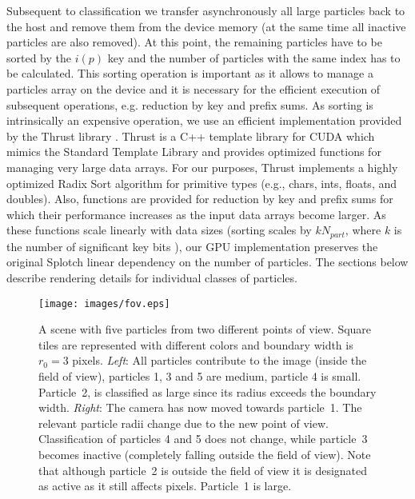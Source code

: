 \documentclass[1p]{elsarticle}
\begin{document}
Subsequent to classification we transfer asynchronously all large particles back to the host and remove them from the device memory (at the same time all inactive particles are also removed). At this point, the remaining particles have to be sorted by the $i(p)$ key and the number of particles with the same index has to be calculated.
This sorting operation is important as it allows to manage a particles array on the device and it is  
necessary for the efficient execution of subsequent operations, e.g. reduction by key and prefix sums.
As sorting is intrinsically an expensive operation, we use an efficient implementation provided by the Thrust library \cite{thrusturl}. Thrust is a C++ template library for CUDA which mimics the Standard Template Library and provides optimized functions for managing very large data arrays. For our purposes, Thrust implements a highly optimized Radix Sort algorithm for primitive types (e.g., chars, ints, floats, and doubles). Also, functions are provided for reduction by key and prefix sums for which their performance increases as the input data arrays become larger. As these functions scale linearly with data sizes (sorting scales by $kN_{part}$, where $k$ is the number of significant key bits \cite{RadixSort}), our GPU implementation preserves the original Splotch linear dependency on the number of particles. The sections below describe rendering details for individual classes of particles.

\begin{figure}
\centering
\texttt{[image: images/fov.eps]}
\caption{A scene with five particles from two different points of view. Square tiles are
represented with different colors and boundary width is $r_0=3$ pixels. {\em Left}: All particles contribute to the image (inside the field of view), particles 1, 3 and 5
are medium, particle 4 is small. Particle~2, is classified as large since its radius exceeds the boundary width. {\em Right}: The camera has now moved towards particle~1. The relevant particle radii change due to the new point
of view. Classification of particles 4 and 5 does not change, while particle~3
becomes inactive (completely falling outside the field of view). Note that although particle~2 is outside the field of view it is designated as active as it still affects pixels.
Particle~1 is large.
}
\label{fig:fov}
\end{figure}
\end{document}
